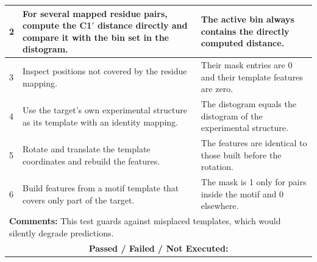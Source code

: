 \documentclass{FastFyp}
\begin{document}
{\begin{longtable}{|p{2.4cm}|p{4.6cm}|p{2.4cm}|p{3.8cm}|}
2 & For several mapped residue pairs, compute the C1$'$ distance directly and compare it with the bin set in the distogram. & \multicolumn{2}{p{6.64cm}|}{The active bin always contains the directly computed distance.} \\ \hline
3 & Inspect positions not covered by the residue mapping. & \multicolumn{2}{p{6.64cm}|}{Their mask entries are 0 and their template features are zero.} \\ \hline
4 & Use the target's own experimental structure as its template with an identity mapping. & \multicolumn{2}{p{6.64cm}|}{The distogram equals the distogram of the experimental structure.} \\ \hline
5 & Rotate and translate the template coordinates and rebuild the features. & \multicolumn{2}{p{6.64cm}|}{The features are identical to those built before the rotation.} \\ \hline
6 & Build features from a motif template that covers only part of the target. & \multicolumn{2}{p{6.64cm}|}{The mask is 1 only for pairs inside the motif and 0 elsewhere.} \\ \hline
\multicolumn{4}{|p{14.51cm}|}{\textbf{Comments:} This test guards against misplaced templates, which would silently degrade predictions.} \\ \hline
\multicolumn{4}{|c|}{\textbf{Passed / Failed / Not Executed:}} \\ \hline
\end{longtable}
}
\end{document}
